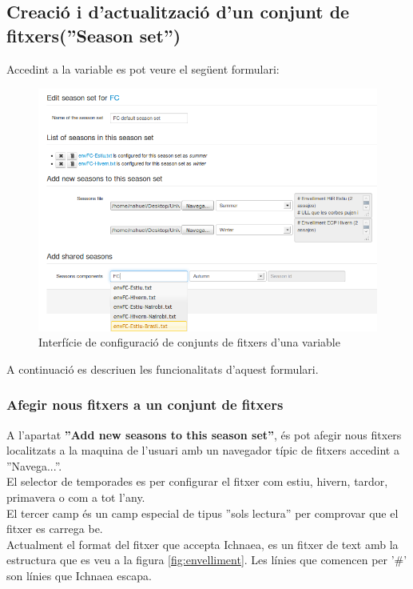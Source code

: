 \subsection{Creació i d'actualització d'un conjunt de fitxers(''Season set'')}
Accedint a la variable es pot veure el següent formulari:\\
\label{season_set:variable}
\begin{figure}[h!]
  \centering
  \includegraphics[scale=0.5]{img/userguide/season_set_edition.png}
  \caption{Interfície de configuraci\'{o} de conjunts de fitxers d'una variable}
  \label{fig:seasonSetEdition}
\end{figure}

A continuació es descriuen les funcionalitats d'aquest formulari.

\subsubsection{Afegir nous fitxers a un conjunt de fitxers}
A l'apartat \textbf{''Add new seasons to this season set''}, \'{e}s pot afegir nous fitxers localitzats a la maquina de l'usuari amb un navegador típic de fitxers accedint a ''Navega...''. \\

El selector de temporades es per configurar el fitxer com estiu, hivern, tardor, primavera o com a tot l'any.\\

El tercer camp \'{e}s un camp especial de tipus ''sols lectura'' per comprovar que el fitxer es carrega be.\\

Actualment el format del fitxer que accepta Ichnaea, es un fitxer de text amb la estructura que es veu a la figura \ref{fig:envelliment}. Les línies que comencen per '\#' son línies que Ichnaea escapa.

